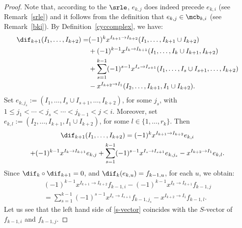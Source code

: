 \begin{proof}
Note that, according to the $\srle$, $e_{k,j}$ does indeed precede
$e_{k,i}$ (see Remark~\ref{srle}) and it follows from the definition
that $e_{k,j}\in\mcb_{k,i}$ (see Remark~\ref{bki}). By
Definition~\ref{cyccomplex}, we have:
\begin{align*}
\dif_{k+1}(I_1,\ldots,I_{k+2})=& (-1)^{k}x^{I_{k+1}\to
    I_{k+2}}(I_1,\ldots ,I_{k+1}\cup I_{k+2})\\
&+ (-1)^{k-1}x^{I_{k}\to I_{k+1}}(I_1,\ldots ,I_{k}\cup
  I_{k+1},I_{k+2})\\
&+\sum_{s=1}^{k-1}(-1)^{s-1}x^{I_s\to
    I_{s+1}}(I_1,\ldots ,I_s\cup I_{s+1},\ldots
  ,I_{k+2})\\
&-x^{I_{k+2}\to I_1}(I_2,\ldots,I_{k+1},I_1\cup I_{k+2}).
\end{align*}
Set $e_{k,j_s}:=(I_1,\ldots ,I_s\cup I_{s+1},\ldots ,I_{k+2})$, for
some $j_s$, with $1\leq j_1<\cdots< j_s<\cdots<j_{k-1}<j<i$.
Moreover, set $e_{k,l}:=(I_2,\ldots,I_{k+1},I_1\cup I_{k+2})$, for
some $l\in \{1,\ldots ,r_{k}\}$. Then
\begin{multline}\label{difbasisele}
 \dif_{k+1}(I_1,\ldots,I_{k+2})= (-1)^{k}x^{I_{k+1}\to
  I_{k+2}}e_{k,i}\\ 
+(-1)^{k-1}x^{I_{k}\to   I_{k+1}}e_{k,j}+ \sum_{s=1}^{k-1}(-1)^{s-1}x^{I_s\to
  I_{s+1}}e_{k,j_s}-x^{I_{k+2}\to I_1}e_{k,l}.
\end{multline}
Since $\dif_{k}\circ\dif_{k+1}=0$, and $\dif_{k}(e_{k,u})=f_{k-1,u}$,
for each $u$, we obtain:
\begin{multline}\label{s-vector}
 (-1)^{k-1}x^{I_{k+1}\to I_{k+2}}f_{k-1,i}-(-1)^{k-1}x^{I_{k}\to
    I_{k+1}}f_{k-1,j}\\
= \sum_{s=1}^{k-1}(-1)^{s-1}x^{I_s\to
    I_{s+1}}f_{k-1,j_s}-x^{I_{k+2}\to I_1}f_{k-1,l}.
\end{multline}
Let us see that the left hand side of \eqref{s-vector} coincides
with the $S$-vector of $f_{k-1,i}$ and $f_{k-1,j}$. 


\end{proof}
